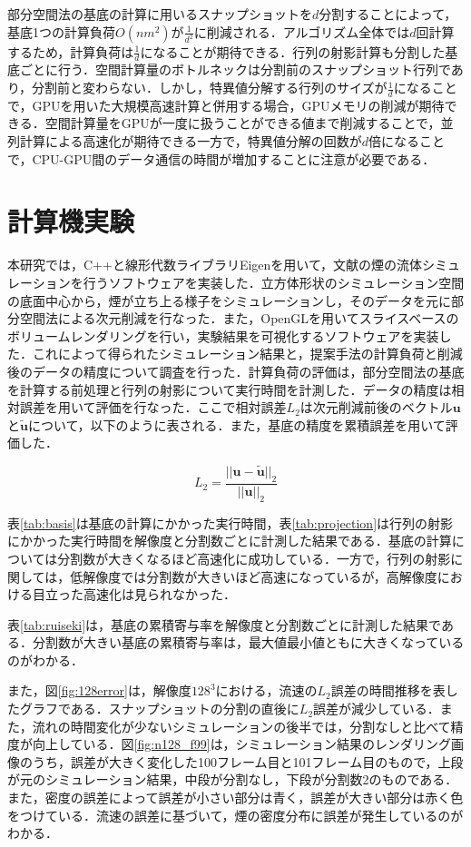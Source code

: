 \documentclass[uplatex,dvipdfmx,10pt,a4paper,notitlepage,oneside,twocolumn]{abst_jsarticle}
\begin{document}
部分空間法の基底の計算に用いるスナップショットを$d$分割することによって，基底1つの計算負荷$O(nm^2)$が$\frac{1}{d^2}$に削減される．アルゴリズム全体では$d$回計算するため，計算負荷は$\frac{1}{d}$になることが期待できる．行列の射影計算も分割した基底ごとに行う．空間計算量のボトルネックは分割前のスナップショット行列であり，分割前と変わらない．しかし，特異値分解する行列のサイズが$\frac{1}{d}$になることで，GPUを用いた大規模高速計算と併用する場合，GPUメモリの削減が期待できる．空間計算量をGPUが一度に扱うことができる値まで削減することで，並列計算による高速化が期待できる一方で，特異値分解の回数が$d$倍になることで，CPU-GPU間のデータ通信の時間が増加することに注意が必要である．

\section{計算機実験}
本研究では，C++と線形代数ライブラリEigenを用いて，文献\cite{fedkiw}の煙の流体シミュレーションを行うソフトウェアを実装した．立方体形状のシミュレーション空間の底面中心から，煙が立ち上る様子をシミュレーションし，そのデータを元に部分空間法による次元削減を行なった．また，OpenGLを用いてスライスベースのボリュームレンダリングを行い，実験結果を可視化するソフトウェアを実装した．これによって得られたシミュレーション結果と，提案手法の計算負荷と削減後のデータの精度について調査を行った．計算負荷の評価は，部分空間法の基底を計算する前処理と行列の射影について実行時間を計測した．データの精度は相対誤差を用いて評価を行なった．ここで相対誤差$L_2$は次元削減前後のベクトル$\bm{u}$と$\bm{\widetilde{u}}$について，以下のように表される．また，基底の精度を累積誤差を用いて評価した．

\[
L_2 = \frac{|| \bm{u} - \bm{\widetilde{u}} ||_2}{||  \bm{u} ||_2}
\]

表\ref{tab:basis}は基底の計算にかかった実行時間，表\ref{tab:projection}は行列の射影にかかった実行時間を解像度と分割数ごとに計測した結果である．基底の計算については分割数が大きくなるほど高速化に成功している．一方で，行列の射影に関しては，低解像度では分割数が大きいほど高速になっているが，高解像度における目立った高速化は見られなかった．

表\ref{tab:ruiseki}は，基底の累積寄与率を解像度と分割数ごとに計測した結果である．分割数が大きい基底の累積寄与率は，最大値最小値ともに大きくなっているのがわかる．

また，図\ref{fig:128error}は，解像度$128^3$における，流速の$L_2$誤差の時間推移を表したグラフである．スナップショットの分割の直後に$L_2$誤差が減少している．また，流れの時間変化が少ないシミュレーションの後半では，分割なしと比べて精度が向上している．図\ref{fig:n128_f99}は，シミュレーション結果のレンダリング画像のうち，誤差が大きく変化した100フレーム目と101フレーム目のもので，上段が元のシミュレーション結果，中段が分割なし，下段が分割数2のものである．また，密度の誤差によって誤差が小さい部分は青く，誤差が大きい部分は赤く色をつけている．流速の誤差に基づいて，煙の密度分布に誤差が発生しているのがわかる．
\end{document}
